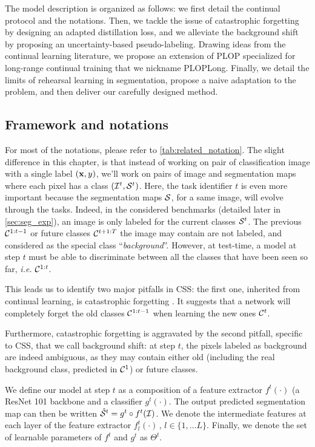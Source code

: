 The model description is organized as follows: we first detail the continual protocol and the
notations. Then, we tackle the issue of catastrophic forgetting by designing an adapted distillation
loss, and we alleviate the background shift by proposing an uncertainty-based pseudo-labeling. Drawing
ideas from the continual learning literature, we propose an extension of PLOP specialized for
long-range continual training that we nickname PLOPLong. Finally, we detail the limits of rehearsal
learning in segmentation, propose a naive adaptation to the problem, and then deliver our carefully
designed method.

\subsection{Framework and notations}\label{sec:seg_overview}

For most of the notations, please refer to \autoref{tab:related_notation}. The slight difference in
this chapter, is that instead of working on pair of classification image with a single label $(\mathbf{x},
    y)$, we'll work on pairs of image and segmentation maps where each pixel has a class $(\mathcal{I}^t,
    \mathcal{S}^t)$. Here, the task identifier $t$ is even more important because the segmentation maps $\mathcal{S}$,
for a same image, will evolve through the tasks. Indeed, in the considered benchmarks (detailed
later in \autoref{sec:seg_exp}), an image is only labeled for the current classes $\mathcal{S}^t$. The
previous $\mathcal{C}^{1:t-1}$ or future classes $\mathcal{C}^{t+1:T}$ the image may contain are not labeled, and
considered as the special class ``\textit{background}''. However, at test-time, a model at step $t$
must be able to discriminate between all the classes that have been seen so far, \textit{i.e.}
$\mathcal{C}^{1:t}$.

This leads us to identify two major pitfalls in \ac{CSS}: the first one, inherited from continual
learning, is catastrophic forgetting \cite{robins1995catastrophicforgetting}. It suggests that a
network will completely forget the old classes $\mathcal{C}^{1:t-1}$ when learning the new ones $\mathcal{C}^t$.

Furthermore, catastrophic forgetting is aggravated by the second pitfall, specific to \ac{CSS}, that
we call background shift: at step $t$, the pixels labeled as background are indeed ambiguous, as
they may contain either old (including the real background class, predicted in $\mathcal{C}^{1}$) or future
classes.

We define our model at step $t$ as a composition of a feature extractor $f^t(\cdot)$ (a ResNet 101
\cite{he2016resnet} backbone and a classifier $g^t(\cdot)$. The output predicted segmentation map
can then be written $\hat{\mathcal{S}}^t = g^t \circ f^t(\mathcal{I})$. We denote the intermediate features at
each layer of the feature extractor $f_l^t(\cdot)\,,\, l \in \{1, \dots L\}$. Finally, we denote the
set of learnable parameters of $f^t$ and $g^t$ as $\Theta^t$.



